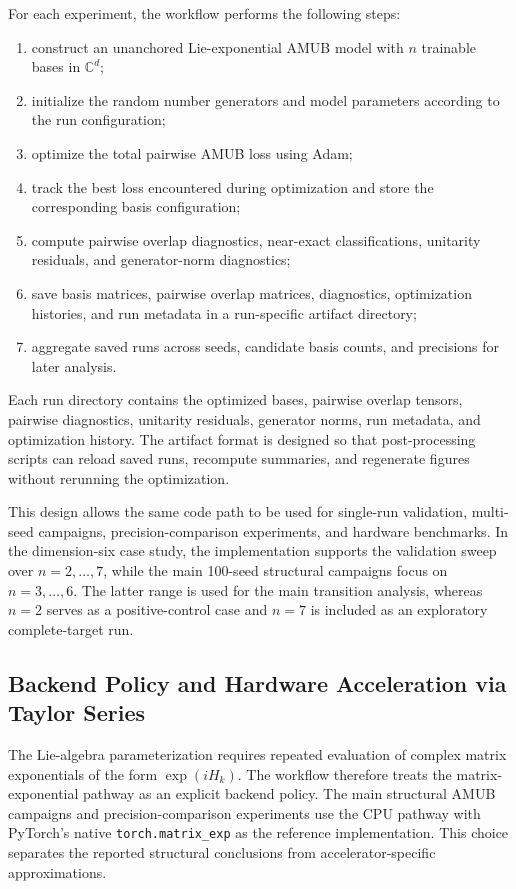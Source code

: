 \documentclass[a4paper,twocolumn,11pt,amsfonts,amssymb]{quantumarticle}
\begin{document}
For each experiment, the workflow performs the following steps:
\begin{enumerate}
    \item construct an unanchored Lie-exponential AMUB model with \(n\) trainable bases in \(\mathbb{C}^d\);
    \item initialize the random number generators and model parameters according to the run configuration;
    \item optimize the total pairwise AMUB loss using Adam;
    \item track the best loss encountered during optimization and store the corresponding basis configuration;
    \item compute pairwise overlap diagnostics, near-exact classifications, unitarity residuals, and generator-norm diagnostics;
    \item save basis matrices, pairwise overlap matrices, diagnostics, optimization histories, and run metadata in a run-specific artifact directory;
    \item aggregate saved runs across seeds, candidate basis counts, and precisions for later analysis.
\end{enumerate}

Each run directory contains the optimized bases, pairwise overlap tensors, pairwise diagnostics, unitarity residuals, generator norms, run metadata, and optimization history. The artifact format is designed so that post-processing scripts can reload saved runs, recompute summaries, and regenerate figures without rerunning the optimization.

This design allows the same code path to be used for single-run validation, multi-seed campaigns, precision-comparison experiments, and hardware benchmarks. In the dimension-six case study, the implementation supports the validation sweep over \(n=2,\ldots,7\), while the main 100-seed structural campaigns focus on \(n=3,\ldots,6\). The latter range is used for the main transition analysis, whereas \(n=2\) serves as a positive-control case and \(n=7\) is included as an exploratory complete-target run.

\subsection{Backend Policy and Hardware Acceleration via Taylor Series}

The Lie-algebra parameterization requires repeated evaluation of complex matrix exponentials of the form \(\exp(iH_k)\). The workflow therefore treats the matrix-exponential pathway as an explicit backend policy. The main structural AMUB campaigns and precision-comparison experiments use the CPU pathway with PyTorch's native \texttt{torch.matrix\_exp} as the reference implementation. This choice separates the reported structural conclusions from accelerator-specific approximations.
\end{document}
